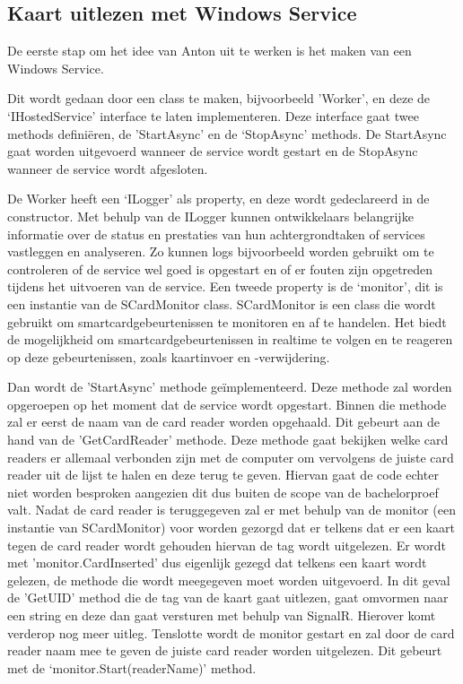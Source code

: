\subsection{Kaart uitlezen met Windows Service}
De eerste stap om het idee van Anton uit te werken is het maken van een Windows Service.  

Dit wordt gedaan door een class te maken, bijvoorbeeld 'Worker’, en deze de ‘IHostedService’ interface te laten implementeren. Deze interface gaat twee methods definiëren, de 'StartAsync’ en de ‘StopAsync’ methods. De StartAsync gaat worden uitgevoerd wanneer de service wordt gestart en de StopAsync wanneer de service wordt afgesloten.  

De Worker heeft een ‘ILogger’ als property, en deze wordt gedeclareerd in de constructor. Met behulp van de ILogger kunnen ontwikkelaars belangrijke informatie over de status en prestaties van hun achtergrondtaken of services vastleggen en analyseren. Zo kunnen logs bijvoorbeeld worden gebruikt om te controleren of de service wel goed is opgestart en of er fouten zijn opgetreden tijdens het uitvoeren van de service. Een tweede property is de ‘monitor’, dit is een instantie van de SCardMonitor class.  SCardMonitor is een class die wordt gebruikt om smartcardgebeurtenissen te monitoren en af te handelen. Het biedt de mogelijkheid om smartcardgebeurtenissen in realtime te volgen en te reageren op deze gebeurtenissen, zoals kaartinvoer en -verwijdering.

Dan wordt de 'StartAsync’ methode geïmplementeerd. Deze methode zal worden opgeroepen op het moment dat de service wordt opgestart. Binnen die methode zal er eerst de naam van de card reader worden opgehaald. Dit gebeurt aan de hand van de 'GetCardReader’ methode. Deze methode gaat bekijken welke card readers er allemaal verbonden zijn met de computer om vervolgens de juiste card reader uit de lijst te halen en deze terug te geven. Hiervan gaat de code echter niet worden besproken aangezien dit dus buiten de scope van de bachelorproef valt. Nadat de card reader is teruggegeven zal er met behulp van de monitor (een instantie van SCardMonitor) voor worden gezorgd dat er telkens dat er een kaart tegen de card reader wordt gehouden hiervan de tag wordt uitgelezen. Er wordt met 'monitor.CardInserted’ dus eigenlijk gezegd dat telkens een kaart wordt gelezen, de methode die wordt meegegeven moet worden uitgevoerd. In dit geval de 'GetUID’ method die de tag van de kaart gaat uitlezen, gaat omvormen naar een string en deze dan gaat versturen met behulp van SignalR. Hierover komt verderop nog meer uitleg. Tenslotte wordt de monitor gestart en zal door de card reader naam mee te geven de juiste card reader worden uitgelezen. Dit gebeurt met de ‘monitor.Start(readerName)’ method. 

